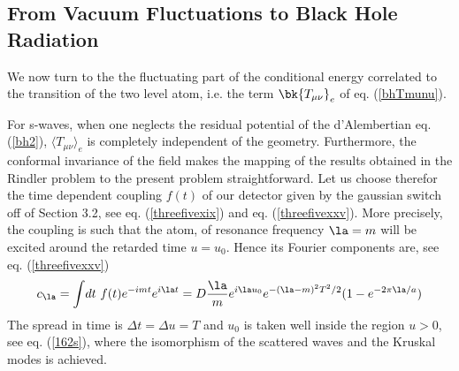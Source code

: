 \documentclass[12pt]{article}
\begin{document}
\subsection{From Vacuum Fluctuations to Black Hole Radiation}\label{vacfl}

We now turn to
the
the fluctuating part of the conditional energy correlated to the
transition of the two level atom, i.e. the term $\bk{T_{\mu\nu}}_{e}$ of eq.
 (\ref{bhTmunu}).

For s-waves, when one neglects
the residual potential of the
d'Alembertian  eq. (\ref{bh2}), $\langle
T_{\mu\nu}\rangle_e$ is completely independent of
the geometry.
Furthermore, the conformal invariance of the field makes
the mapping of the results obtained in the Rindler problem to the
present problem
straightforward.
Let us choose therefor the time dependent coupling $f(t)$ of our detector
given by the gaussian switch off of Section 3.2, see eq. (\ref{threefivexix})
and eq. (\ref{threefivexxv}). More precisely,
the coupling is
such that the atom, of resonance frequency $\la = m$ will be excited
around the retarded time
$u=u_0$.
Hence its
Fourier
components
are, see  eq. (\ref{threefivexxv})
\begin{equation}
 c_\la =
\int \!dt\ f(t) e^{-imt}e^{i\la t} =
D { \la \over m} e^{i \la u_0}e^{-(\la - m )^2 T^2 /2}
 (1 -
e^{-2\pi \la /a})
\end{equation}
The spread in time is $\Delta t = \Delta u = T$
 and $u_0$ is taken well inside
the region $u>0$, see eq. (\ref{162s}),
 where the isomorphism of the scattered waves and the
Kruskal modes is achieved.
\end{document}
